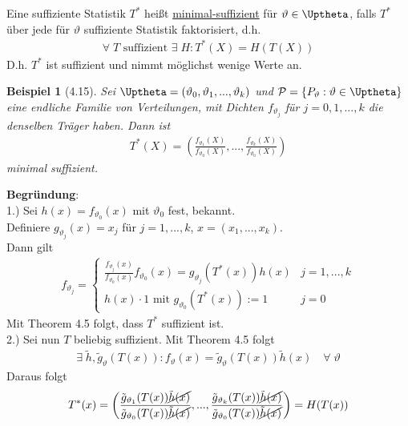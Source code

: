 \documentclass[a4paper,openany]{book}
\theoremstyle{mytheoremstyle}
\newtheorem*{bei}{Beispiel}
\theoremstyle{mytheoremstyle2}
\begin{document}
\begin{defi}{4.14}{}
  Eine suffiziente Statistik $T^*$ heißt \underline{minimal-suffizient} für $\vartheta \in \Uptheta$, falls $T^*$ über jede für $\vartheta $ suffiziente Statistik faktorisiert, d.h.
  \begin{align*}
    \forall \;T \text{ suffizient }\exists \;H:T^*(X)=H(T(X))
  \end{align*}
  D.h. $T^*$ ist suffizient und nimmt möglichst wenige Werte an. 
\end{defi}
\begin{bei}[4.15]
  Sei $\Uptheta=(\vartheta _0,\vartheta _1,...,\vartheta _k)$ und $\mathcal{P}=\left\{P _{\vartheta }:\vartheta \in \Uptheta\right\}$ eine endliche Familie von Verteilungen, mit Dichten $f _{\vartheta_j }$ für $j=0,1,...,k$ die denselben Träger haben. Dann ist 
  \begin{align*}
    T^*(X)=\left(\frac{f _{\vartheta _1}(X)}{f _{\vartheta _0}(X)},...,\frac{f _{\vartheta _k}(X)}{f _{\vartheta _0}(X)}\right)
  \end{align*}
  minimal suffizient.
\end{bei}
\noindent \textbf{Begründung}: \\
1.) Sei $h(x)=f _{\vartheta _0}(x)$ mit $\vartheta _0$ fest, bekannt. \\
Definiere $g _{\vartheta _j}(x)=x_j$ für $j=1,...,k$, $x=(x_1,...,x_k)$. \\
Dann gilt 
\begin{align*}
 f _{\vartheta _j}=\begin{cases}
  \frac{f _{\vartheta _j}(x)}{f _{\vartheta _0}(x)}f _{\vartheta _0}(x)=g _{\vartheta _j}(T^*(x))h(x) &j=1,...,k\\
  h(x)\cdot 1 \text{ mit }g _{\vartheta _0}(T^*(x)):=1 &j=0
 \end{cases} 
\end{align*}
Mit Theorem 4.5 folgt, dass $T^*$ suffizient ist. \\
2.) Sei nun $T$ beliebig suffizient. Mit Theorem 4.5 folgt 
\begin{align*}
  \exists\;\tilde{h},\tilde{g}_{\vartheta }(T(x)):f _{\vartheta }(x)=\tilde{g}_{\vartheta }(T(x))\tilde{h}(x) \quad \forall\; \vartheta 
\end{align*}
Daraus folgt
\begin{align*}
  T^*(x)=\left(\frac{\tilde{g}_{\vartheta _1}(T(x))\cancel{\tilde{h}(x)}}{\tilde{g}_{\vartheta _0}(T(x))\cancel{\tilde{h}(x)}},...,\frac{\tilde{g}_{\vartheta _k}(T(x))\cancel{\tilde{h}(x)}}{\tilde{g}_{\vartheta _0}(T(x))\cancel{\tilde{h}(x)}}\right)=H(T(x))
\end{align*}
\end{document}
